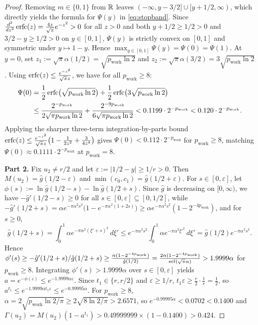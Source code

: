 \begin{proof}
Removing $m \in \{0, 1\}$ from $\mathbb{R}$ leaves $(-\infty, y - 3/2] \cup [y + 1/2, \infty)$, which directly yields the formula for $\Psi(y)$ in \eqref{eq:stopband}. Since $\frac{d^2}{dz^2}\operatorname{erfc}(z) = \frac{4z}{\sqrt{\pi}} e^{-z^2} > 0$ for all $z > 0$ and both $y + 1/2 \ge 1/2 > 0$ and $3/2 - y \ge 1/2 > 0$ on $y \in [0, 1]$, $\Psi(y)$ is strictly convex on $[0, 1]$ and symmetric under $y \mapsto 1 - y$. Hence $\max_{y \in [0, 1]} \Psi(y) = \Psi(0) = \Psi(1)$. At $y = 0$, set $z_1 := \sqrt{\pi}\alpha(1/2) = \sqrt{p_{\mathrm{work}} \ln 2}$ and $z_2 := \sqrt{\pi}\alpha(3/2) = 3\sqrt{p_{\mathrm{work}} \ln 2}$. Using $\operatorname{erfc}(z) \le \frac{e^{-z^2}}{\sqrt{\pi} z}$, we have for all $p_{\mathrm{work}} \ge 8$:
\begin{align*}
  \Psi(0) &= \frac{1}{2}\operatorname{erfc}\bigl(\sqrt{p_{\mathrm{work}}\ln 2}\bigr) + \frac{1}{2}\operatorname{erfc}\bigl(3\sqrt{p_{\mathrm{work}}\ln 2}\bigr) \\
  &\le \frac{2^{-p_{\mathrm{work}}}}{2\sqrt{\pi p_{\mathrm{work}} \ln 2}} + \frac{2^{-9p_{\mathrm{work}}}}{6\sqrt{\pi p_{\mathrm{work}} \ln 2}} < 0.1199 \cdot 2^{-p_{\mathrm{work}}} < 0.120 \cdot 2^{-p_{\mathrm{work}}}.
\end{align*}
Applying the sharper three-term integration-by-parts bound $\operatorname{erfc}(z) \le \frac{e^{-z^2}}{\sqrt{\pi} z}\bigl(1 - \frac{1}{2z^2} + \frac{3}{4z^4}\bigr)$ gives $\Psi(0) < 0.112 \cdot 2^{-p_{\mathrm{work}}}$ for $p_{\mathrm{work}} \ge 8$, matching $\Psi(0) \approx 0.1111 \cdot 2^{-p_{\mathrm{work}}}$ at $p_{\mathrm{work}} = 8$.

\textbf{Part 2.} Fix $u_2 \ne r/2$ and let $\varepsilon := |1/2 - y| \ge 1/r > 0$. Then $M(u_2) = \hat{g}(1/2 - \varepsilon)$ and $\min(c_0, c_1) = \hat{g}(1/2 + \varepsilon)$. For $s \in [0, \varepsilon]$, let $\phi(s) := \ln \hat{g}(1/2 - s) - \ln \hat{g}(1/2 + s)$. Since $\hat{g}$ is decreasing on $[0, \infty)$, we have $-\hat{g}'(1/2 - s) \ge 0$ for all $s \in [0, \varepsilon] \subseteq [0, 1/2]$, while $-\hat{g}'(1/2 + s) = \alpha e^{-\pi\alpha^2 s^2}\bigl(1 - e^{-\pi\alpha^2(1 + 2s)}\bigr) \ge \alpha e^{-\pi\alpha^2 s^2}(1 - 2^{-4p_{\mathrm{work}}})$, and for $s \ge 0$,
\[
  \hat{g}(1/2 + s) = \int_0^1 \alpha e^{-\pi\alpha^2(\xi' + s)^2}\,d\xi' \le e^{-\pi\alpha^2 s^2} \int_0^1 \alpha e^{-\pi\alpha^2 \xi'^2}\,d\xi' = \hat{g}(1/2) e^{-\pi\alpha^2 s^2}.
\]
Hence $\phi'(s) \ge -\hat{g}'(1/2 + s) / \hat{g}(1/2 + s) \ge \frac{\alpha(1 - 2^{-4p_{\mathrm{work}}})}{\hat{g}(1/2)} = \frac{2\alpha(1 - 2^{-4p_{\mathrm{work}}})}{\operatorname{erf}(\sqrt{\pi}\alpha)} > 1.9999\alpha$ for $p_{\mathrm{work}} \ge 8$. Integrating $\phi'(s) > 1.9999\alpha$ over $s \in [0, \varepsilon]$ yields $a = e^{-\phi(\varepsilon)} \le e^{-1.9999\alpha\varepsilon}$. Since $t_1 \in \{r, r/2\}$ and $\varepsilon \ge 1/r$, $t_1 \varepsilon \ge \frac{r}{2} \cdot \frac{1}{r} = \frac{1}{2}$, so $a^{t_1} \le e^{-1.9999\alpha t_1 \varepsilon} \le e^{-0.99995\alpha}$. For $p_{\mathrm{work}} \ge 8$, $\alpha = 2\sqrt{p_{\mathrm{work}} \ln 2 / \pi} \ge 2\sqrt{8\ln 2 / \pi} > 2.6571$, so $e^{-0.99995\alpha} < 0.0702 < 0.1400$ and $\Gamma(u_2) = M(u_2)(1 - a^{t_1}) > 0.49999999 \times (1 - 0.1400) > 0.424$.


\end{proof}
